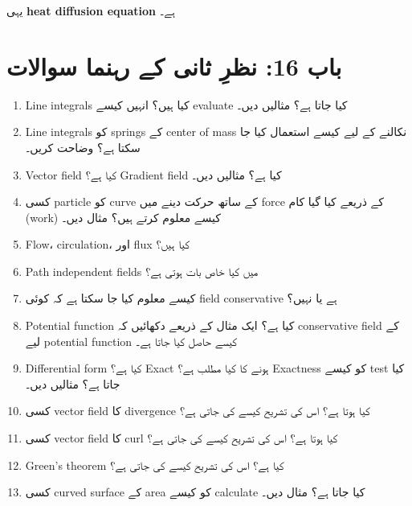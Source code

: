 \begin{enumerate}
یہی \textbf{heat diffusion equation} ہے۔


\section*{باب 16: نظرِ ثانی کے رہنما سوالات}

\begin{enumerate}
\item Line integrals کیا ہیں؟ انہیں کیسے evaluate کیا جاتا ہے؟ مثالیں دیں۔

\item Line integrals کو springs کے center of mass نکالنے کے لیے کیسے استعمال کیا جا سکتا ہے؟ وضاحت کریں۔

\item Vector field کیا ہے؟ Gradient field کیا ہے؟ مثالیں دیں۔

\item کسی particle کو curve کے ساتھ حرکت دینے میں force کے ذریعے کیا گیا کام (work) کیسے معلوم کرتے ہیں؟ مثال دیں۔

\item Flow، circulation، اور flux کیا ہیں؟

\item Path independent fields میں کیا خاص بات ہوتی ہے؟

\item کیسے معلوم کیا جا سکتا ہے کہ کوئی field conservative ہے یا نہیں؟

\item Potential function کیا ہے؟ ایک مثال کے ذریعے دکھائیں کہ conservative field کے لیے potential function کیسے حاصل کیا جاتا ہے۔

\item Differential form کیا ہے؟ Exact ہونے کا کیا مطلب ہے؟ Exactness کو کیسے test کیا جاتا ہے؟ مثالیں دیں۔

\item کسی vector field کا divergence کیا ہوتا ہے؟ اس کی تشریح کیسے کی جاتی ہے؟

\item کسی vector field کا curl کیا ہوتا ہے؟ اس کی تشریح کیسے کی جاتی ہے؟

\item Green’s theorem کیا ہے؟ اس کی تشریح کیسے کی جاتی ہے؟

\item کسی curved surface کے area کو کیسے calculate کیا جاتا ہے؟ مثال دیں۔
\end{enumerate}


\end{enumerate}

